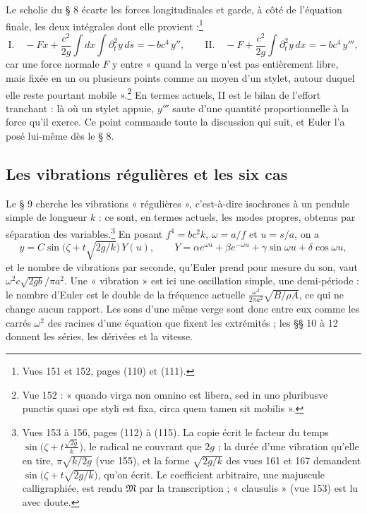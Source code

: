 \documentclass[11pt,a4paper]{article}
\begin{document}
Le scholie du § 8 écarte les forces longitudinales et garde, à côté de l'équation finale, les deux intégrales dont elle provient :\footnote{Vues 151 et 152, pages (110) et (111).}
\[
\text{I.}\quad -Fx+\frac{c^2}{2g}\int dx\int \partial_t^2 y\,ds=-\,bc^4\,y'',\qquad
\text{II.}\quad -F+\frac{c^2}{2g}\int \partial_t^2 y\,dx=-\,bc^4\,y''',
\]
car une force normale $F$ y entre « quand la verge n'est pas entièrement libre, mais fixée en un ou plusieurs points comme au moyen d'un stylet, autour duquel elle reste pourtant mobile ».\footnote{Vue 152 : « quando virga non omnino est libera, sed in uno pluribusve punctis quasi ope styli est fixa, circa quem tamen sit mobilis ».} En termes actuels, II est le bilan de l'effort tranchant : là où un stylet appuie, $y'''$ saute d'une quantité proportionnelle à la force qu'il exerce. Ce point commande toute la discussion qui suit, et Euler l'a posé lui-même dès le § 8.

\subsection*{Les vibrations régulières et les six cas}

Le § 9 cherche les vibrations « régulières », c'est-à-dire isochrones à un pendule simple de longueur $k$ : ce sont, en termes actuels, les modes propres, obtenus par séparation des variables.\footnote{Vues 153 à 156, pages (112) à (115). La copie écrit le facteur du temps $\sin\bigl(\zeta+t\frac{\sqrt{2g}}{k}\bigr)$, le radical ne couvrant que $2g$ ; la durée d'une vibration qu'elle en tire, $\pi\sqrt{k/2g}$ (vue 155), et la forme $\sqrt{2g/k}$ des vues 161 et 167 demandent $\sin\bigl(\zeta+t\sqrt{2g/k}\bigr)$, qu'on écrit. Le coefficient arbitraire, une majuscule calligraphiée, est rendu $\mathfrak{M}$ par la transcription ; « clausulis » (vue 153) est lu avec doute.} En posant $f^4=bc^2k$, $\omega=a/f$ et $u=s/a$, on a
\[
y=C\sin\bigl(\zeta+t\sqrt{2g/k}\bigr)\,Y(u),\qquad
Y=\alpha e^{\omega u}+\beta e^{-\omega u}+\gamma\sin\omega u+\delta\cos\omega u,
\]
et le nombre de vibrations par seconde, qu'Euler prend pour mesure du son, vaut $\omega^2c\sqrt{2gb}/\pi a^2$. Une « vibration » est ici une oscillation simple, une demi-période : le nombre d'Euler est le double de la fréquence actuelle $\frac{\omega^2}{2\pi a^2}\sqrt{B/\rho A}$, ce qui ne change aucun rapport. Les sons d'une même verge sont donc entre eux comme les carrés $\omega^2$ des racines d'une équation que fixent les extrémités ; les §§ 10 à 12 donnent les séries, les dérivées et la vitesse.
\end{document}
